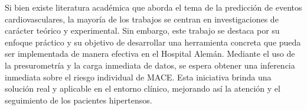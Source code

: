 Si bien existe literatura académica que aborda el tema de la predicción de eventos cardiovasculares, 
la mayoría de los trabajos se centran en investigaciones de carácter teórico y experimental. Sin embargo, este trabajo 
se destaca por su enfoque práctico y su objetivo de desarrollar una herramienta concreta que pueda ser implementada 
de manera efectiva en el Hospital Alemán. Mediante el uso de la presurometría  y la carga inmediata de datos, se espera 
obtener una inferencia inmediata sobre el riesgo individual de MACE. Esta iniciativa brinda una solución real y 
aplicable en el entorno clínico, mejorando así la atención y el seguimiento de los pacientes hipertensos.